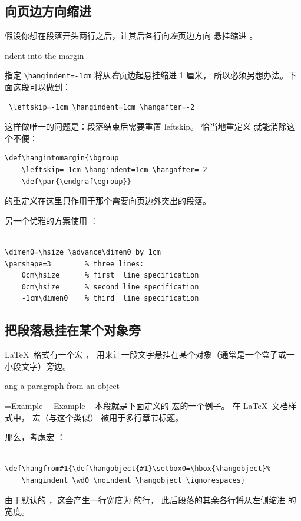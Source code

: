 \documentclass[a4paper]{rapport3}
\def\howto#1\par{}
\begin{document}
\subsection{向页边方向缩进}

假设你想在段落开头两行之后，让其后各行向{\sl 左\/}页边方向
悬挂缩进 \n{1cm}。
\howto Indent into the margin\par
指定 \verb/\hangindent=-1cm/ 将从{\sl 右\/}页边起悬挂缩进 1 厘米，
所以必须另想办法。下面这段可以做到：
\begin{verbatim}
 \leftskip=-1cm \hangindent=1cm \hangafter=-2
\end{verbatim}
这样做唯一的问题是：段落结束后需要重置 leftskip。
恰当地重定义  就能消除这个不便：
\begin{verbatim}
\def\hangintomargin{\bgroup
    \leftskip=-1cm \hangindent=1cm \hangafter=-2
    \def\par{\endgraf\egroup}}
\end{verbatim}
 的重定义在这里只作用于那个需要向页边外突出的段落。

另一个优雅的方案使用 ：
\begin{verbatim}
 
\dimen0=\hsize \advance\dimen0 by 1cm
\parshape=3        % three lines:
    0cm\hsize      % first  line specification
    0cm\hsize      % second line specification
    -1cm\dimen0    % third  line specification
\end{verbatim}

\subsection{把段落悬挂在某个对象旁}

\LaTeX\ 格式有一个宏 ，
用来让一段文字悬挂在某个对象（通常是一个盒子或一小段文字）旁边。
\howto Hang a paragraph from an object\par 

\begingroup
\medskip
\def\hangobject{Example \ }
=\hbox{\hangobject}
\hangindent {} \noindent \hangobject
本段就是下面定义的  宏的一个例子。
在 \LaTeX\ 文档样式中， 宏（与这个类似）
被用于多行章节标题。\par
\endgroup

那么，考虑宏 ：
\begin{verbatim}
 
\def\hangfrom#1{\def\hangobject{#1}\setbox0=\hbox{\hangobject}%
    \hangindent \wd0 \noindent \hangobject \ignorespaces}
\end{verbatim}
由于默认的 ，这会产生一行宽度为  的行，
此后段落的其余各行将从左侧缩进  的宽度。
\end{document}
